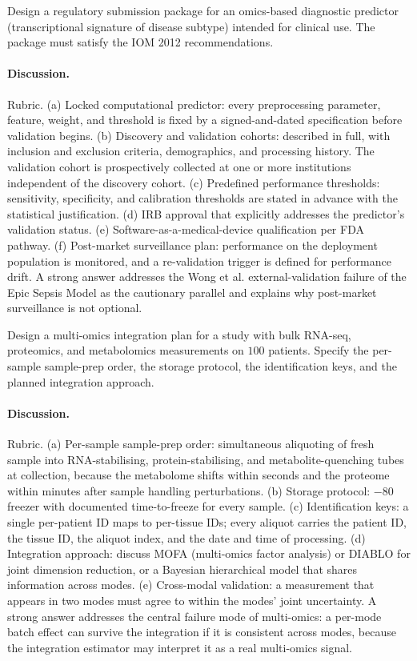 \begin{exercise}
Design a regulatory submission package for an omics-based diagnostic
predictor (transcriptional signature of disease subtype) intended for
clinical use. The package must satisfy the IOM 2012 recommendations.

\paragraph{Discussion.}
Rubric. (a) Locked computational predictor: every preprocessing
parameter, feature, weight, and threshold is fixed by a signed-and-dated
specification before validation begins. (b) Discovery and validation
cohorts: described in full, with inclusion and exclusion criteria,
demographics, and processing history. The validation cohort is
prospectively collected at one or more institutions independent of the
discovery cohort. (c) Predefined performance thresholds: sensitivity,
specificity, and calibration thresholds are stated in advance with the
statistical justification. (d) IRB approval that explicitly addresses
the predictor's validation status. (e) Software-as-a-medical-device
qualification per FDA pathway. (f) Post-market surveillance plan:
performance on the deployment population is monitored, and a
re-validation trigger is defined for performance drift. A strong
answer addresses the Wong et al. external-validation failure of the
Epic Sepsis Model as the cautionary parallel and explains why
post-market surveillance is not optional.
\end{exercise}

\begin{exercise}
Design a multi-omics integration plan for a study with bulk RNA-seq,
proteomics, and metabolomics measurements on $100$ patients. Specify
the per-sample sample-prep order, the storage protocol, the
identification keys, and the planned integration approach.

\paragraph{Discussion.}
Rubric. (a) Per-sample sample-prep order: simultaneous aliquoting of
fresh sample into RNA-stabilising, protein-stabilising, and
metabolite-quenching tubes at collection, because the metabolome
shifts within seconds and the proteome within minutes after sample
handling perturbations. (b) Storage protocol: $-80$~\degC{} freezer
with documented time-to-freeze for every sample. (c) Identification
keys: a single per-patient ID maps to per-tissue IDs; every aliquot
carries the patient ID, the tissue ID, the aliquot index, and the
date and time of processing. (d) Integration approach: discuss MOFA
(multi-omics factor analysis) or DIABLO for joint dimension reduction,
or a Bayesian hierarchical model that shares information across modes.
(e) Cross-modal validation: a measurement that appears in two modes
must agree to within the modes' joint uncertainty. A strong answer
addresses the central failure mode of multi-omics: a per-mode batch
effect can survive the integration if it is consistent across modes,
because the integration estimator may interpret it as a real
multi-omics signal.
\end{exercise}

